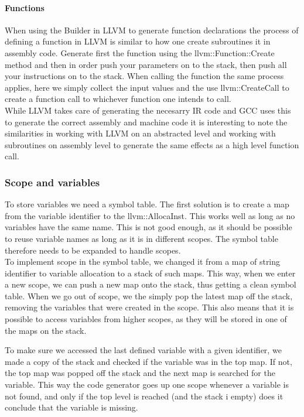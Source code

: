 \paragraph*{Functions}

When using the Builder in LLVM to generate function declarations the process of
defining a function in LLVM is similar to how one create subroutines it in assembly
code. Generate first the function using the llvm::Function::Create method and then in
order push your parameters on to the stack, then push all your instructions on to the
stack. When calling the function the same process applies, here we simply collect the
input values and the use llvm::CreateCall to create a function call to whichever
function one intends to call. \\

While LLVM takes care of generating the necesarry IR code and GCC uses this to
generate the correct assembly and machine code it is interesting to note the
similarities in working with LLVM on an abstracted level and working with subroutines on
assembly level to generate the same effects as a high level function call.


\subsubsection{Scope and variables}
To store variables we need a symbol table. The first solution is to create a map from the variable identifier to the llvm::AllocaInst. This works well as long as no variables have the same name. This is not good enough, as it should be possible to reuse variable names as long as it is in different scopes. The symbol table therefore needs to be expanded to handle scopes.\\
To implement scope in the symbol table, we changed it from a map of string identifier to variable allocation to a stack of such maps. This way, when we enter a new scope, we can push a new map onto the stack, thus getting a clean symbol table. When we go out of scope, we the simply pop the latest map off the stack, removing the variables that were created in the scope. This also means that it is possible to access variables from higher scopes, as they will be stored in one of the maps on the stack.\\


To make sure we accessed the last defined variable with a given identifier, we made a
copy of the stack and checked if the variable was in the top map. If not, the top map was popped off the stack and the next map is searched for the variable. This way the code generator goes up one scope whenever a variable is not found, and only if the top level is reached (and the stack i empty) does it conclude that the variable is missing.\\

